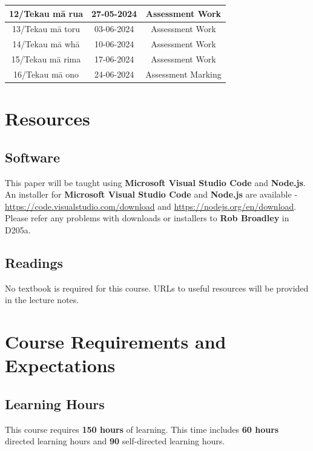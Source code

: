 \documentclass{article}
\begin{document}
\begin{tabular}{|c|c|c|c|}
	12/Tekau mā rua  & 27-05-2024 & \multicolumn{2}{c|}{Assessment Work}                                                                 \\ \hline
	13/Tekau mā toru & 03-06-2024 & \multicolumn{2}{c|}{Assessment Work}                                                     \\ \hline
	14/Tekau mā whā  & 10-06-2024 & \multicolumn{2}{c|}{Assessment Work} \\ \hline 
	15/Tekau mā rima & 17-06-2024 & \multicolumn{2}{c|}{Assessment Work}                                                       \\ \hline
	16/Tekau mā ono  & 24-06-2024 & \multicolumn{2}{c|}{Assessment Marking}                                                         \\ \hline
\end{tabular} 

\section*{Resources}

\subsection*{Software}
This paper will be taught using \textbf{Microsoft Visual Studio Code} and \textbf{Node.js}. An installer for \textbf{Microsoft Visual Studio Code} and \textbf{Node.js} are available - \href{https://code.visualstudio.com/download}{https://code.visualstudio.com/download} and \href{https://nodejs.org/en/download}{https://nodejs.org/en/download}. Please refer any problems with downloads or installers to \textbf{Rob Broadley} in D205a.

\subsection*{Readings}
No textbook is required for this course. URLs to useful resources will be provided in the lecture notes. 

\section*{Course Requirements and Expectations}

\subsection*{Learning Hours}
This course requires \textbf{150 hours} of learning. This time includes \textbf{60 hours} directed learning hours and \textbf{90} self-directed learning hours.
\end{document}
